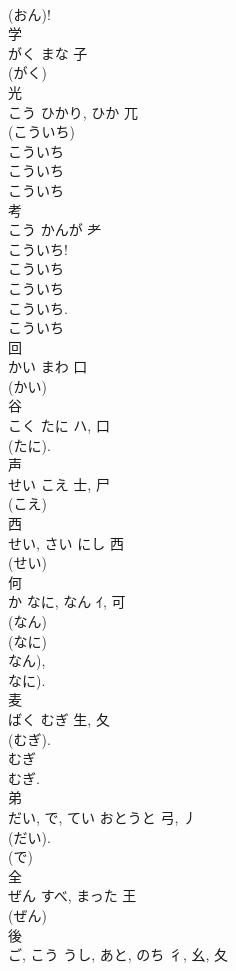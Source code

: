 \documentclass[8pt]{extreport}
\begin{document}
\begin{CJK}{UTF8}{min}
\\	(おん)!	
\\	学	
\\	がく	まな	子		
\\	(がく) 
\\	光	
\\	こう	ひかり, ひか	兀		
\\	(こういち)
\\	こういち
\\	こういち
\\	こういち
\\	考	
\\	こう	かんが	耂		
\\	こういち! 
\\	こういち 
\\	こういち 
\\	こういち. 
\\	こういち 
\\	回	
\\	かい	まわ	口	
\\	(かい) 
\\	谷	
\\	こく	たに	ハ, 口		
\\	(たに). 
\\	声	
\\	せい	こえ	士, 尸		
\\	(こえ) 
\\	西	
\\	せい, さい	にし	西	
\\	(せい) 
\\	何	
\\	か	なに, なん	ｲ, 可	
\\	(なん) 
\\	(なに) 
\\	なん), 
\\	なに). 
\\	麦	
\\	ばく	むぎ	生, 夂	
\\	(むぎ).	
\\	むぎ 
\\	むぎ.	
\\	弟	
\\	だい, で, てい	おとうと	弓, 丿	
\\	(だい). 
\\	(で) 
\\	全	
\\	ぜん	すべ, まった	王		
\\	(ぜん) 
\\	後	
\\	ご, こう	うし, あと, のち	彳, 幺, 夂	

\end{CJK}
\end{document}
